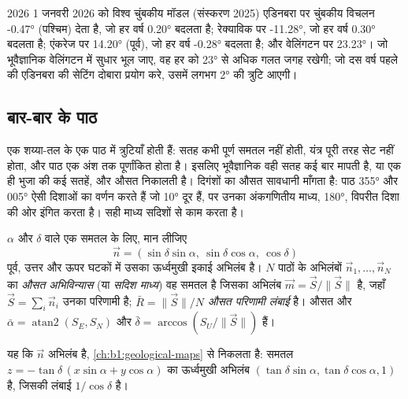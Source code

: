 \begin{dated}{2026}
1 जनवरी 2026 को विश्व चुंबकीय मॉडल (संस्करण 2025) एडिनबरा पर चुंबकीय विचलन \ang{-0.47} (पश्चिम) देता है, जो
हर वर्ष \ang{+0.20} बदलता है; रेक्याविक पर \ang{-11.28}, जो हर वर्ष \ang{+0.30} बदलता है; एंकरेज पर
\ang{+14.20} (पूर्व), जो हर वर्ष \ang{-0.28} बदलता है; और वेलिंगटन पर \ang{+23.23}। जो भूवैज्ञानिक वेलिंगटन में सुधार
भूल जाए, वह हर  को \ang{23} से अधिक गलत जगह रखेगी; जो दस वर्ष पहले की एडिनबरा की सेटिंग दोबारा प्रयोग
करे, उसमें लगभग \ang{2} की त्रुटि आएगी।
\end{dated}

\subsection{बार-बार के पाठ}
एक शय्या-तल के एक पाठ में त्रुटियाँ होती हैं: सतह कभी पूर्ण समतल नहीं होती, यंत्र पूरी तरह सेट नहीं होता, और पाठ
एक अंश तक पूर्णांकित होता है। इसलिए भूवैज्ञानिक वही सतह कई बार मापती है, या एक ही भुजा की कई सतहें, और औसत
निकालती है। दिगंशों का औसत सावधानी माँगता है: पाठ \ang{355} और \ang{005} ऐसी दिशाओं का वर्णन करते हैं जो
\ang{10} दूर हैं, पर उनका अंकगणितीय माध्य, \ang{180}, विपरीत दिशा की ओर इंगित करता है। सही माध्य सदिशों से काम
करता है।

\begin{definition}[औसत अभिविन्यास (सदिश माध्य)]\label{def:b1:field-lab-methods-1:mean-orientation}
 $\alpha$ और  $\delta$ वाले एक समतल के लिए, मान लीजिए
\[
  \vec n = (\sin\delta\sin\alpha,\ \sin\delta\cos\alpha,\ \cos\delta)
\]
पूर्व, उत्तर और ऊपर घटकों में उसका ऊर्ध्वमुखी इकाई अभिलंब है। $N$ पाठों के अभिलंबों $\vec n_1, \dots, \vec n_N$ का
\emph{औसत अभिविन्यास} (या \emph{सदिश माध्य}) वह समतल है जिसका अभिलंब
$\vec m = \vec S/\|\vec S\|$ है, जहाँ $\vec S = \sum_i \vec n_i$ उनका परिणामी है; $\bar R = \|\vec S\|/N$ \emph{औसत
परिणामी लंबाई} है। औसत  और  $\bar\alpha = \operatorname{atan2}(S_E, S_N)$ और
$\bar\delta = \arccos(S_U/\|\vec S\|)$ हैं।
\end{definition}

यह कि $\vec n$ अभिलंब है, \cref{ch:b1:geological-maps} से निकलता है: समतल $z = -\tan\delta\,(x\sin\alpha + y\cos\alpha)$
का ऊर्ध्वमुखी अभिलंब $(\tan\delta\sin\alpha, \tan\delta\cos\alpha, 1)$ है, जिसकी लंबाई $1/\cos\delta$ है।

